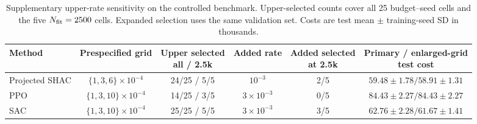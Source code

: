 \begin{table}[H]
\caption{Supplementary upper-rate sensitivity on the controlled benchmark.
Upper-selected counts cover all 25 budget--seed cells and the five
$N_{\rm fit}=2500$ cells. Expanded selection uses the same validation set.
Costs are test mean $\pm$ training-seed SD in thousands.}
\label{tab:rl-rate-sensitivity}
\centering
\scriptsize
\setlength{\tabcolsep}{2.7pt}
\begin{tabular}{@{}lccccc@{}}
\toprule
Method & Prespecified grid & \shortstack{Upper selected\\all / 2.5k}
& Added rate & \shortstack{Added selected\\at 2.5k}
& \shortstack{Primary / enlarged-grid\\test cost}\\
\midrule
Projected SHAC & $\{1,3,6\}\!\times\!10^{-4}$ & 24/25 / 5/5
& $10^{-3}$ & 2/5 & $59.48\pm1.78 / 58.91\pm1.31$\\
PPO & $\{1,3,10\}\!\times\!10^{-4}$ & 14/25 / 3/5
& $3\!\times\!10^{-3}$ & 0/5 & $84.43\pm2.27 / 84.43\pm2.27$\\
SAC & $\{1,3,10\}\!\times\!10^{-4}$ & 25/25 / 5/5
& $3\!\times\!10^{-3}$ & 3/5 & $62.76\pm2.28 / 61.67\pm1.41$\\
\bottomrule
\end{tabular}
\end{table}
